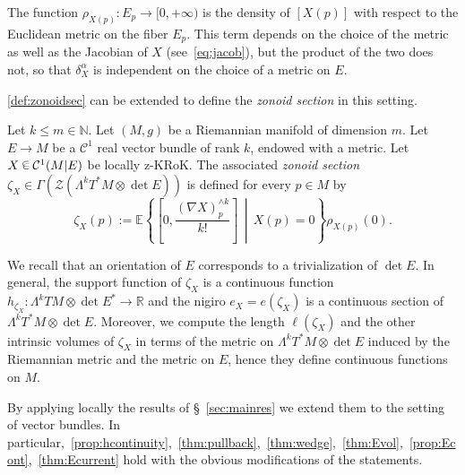 \documentclass[AHL, Unicode, longabstracts, published]{cedram}
\newcommand{\R}{\mathbb{R}}
\newcommand{\N}{\mathbb{N}}
\newcommand{\EE}{\mathbb{E}}
\newcommand{\ZZ}{\mathscr{Z}}
\newcommand{\mC}{\mathcal{C}}
\renewcommand{\a}{\alpha}
\newcommand*\randin{
\mathchoice {\raisebox{-.35ex}{$\displaystyle{^\subset}$}\mkern-11.5mu\raisebox{+.45ex}{$\displaystyle{_\subset}$}} {\mkern+1mu\raisebox{-.27ex}{$\textstyle{^\subset}$}\mkern-11.7mu\raisebox{+.45ex}{$\textstyle{_\subset}$}} {\raisebox{.35ex}{$\scriptstyle\subset$}\mkern-14mu\raisebox{-.15ex}{$\scriptstyle\subset$}} {\raisebox{.3ex}{$\scriptscriptstyle\subset$}\mkern-13.5mu\raisebox{-.10ex}{$\scriptscriptstyle\subset$}}}
\begin{document}
\begin{rema}
The function $\rho_{X(p)}\colon E_p\to [0,+\infty)$ is the density of $[X(p)]$ with respect to the Euclidean metric on the fiber $E_p$. This term depends on the choice of the metric as well as the Jacobian of $X$ (see~\eqref{eq:jacob}), but the product of the two does not, so that $\delta^\a_X$ is independent on the choice of a metric on $E$.
\end{rema}
\cref{def:zonoidsec} can be extended to define the \emph{zonoid section} in this setting.

\begin{defi}\label{def:zonoidsecvb}
Let $k\le m\in \N$. Let $(M,g)$ be a Riemannian manifold of dimension $m$. Let $E\to M$ be a $\mC^1$ real vector bundle of rank $k$, endowed with a metric. Let $X\,\randin\, \mC^1(M|E)$ be locally z-KRoK. The associated \emph{zonoid section} $\zeta_X\in \Gamma(\ZZ(\Lambda^k T^*M\otimes \det E))$ is defined for every $p\in M$ by
\begin{equation*}
\zeta_X(p):=\EE\left\{\left[0,\frac{(\nabla X)^{\wedge k}_p}{k!}\right]\,\middle|\,X(p)=0\right\}\rho_{X(p)}(0).
\end{equation*}
\end{defi}

We recall that an orientation of $E$ corresponds to a trivialization of $\det E$. In general, the support function of $\zeta_X$ is a continuous function $h_{\zeta_X}\colon \Lambda^k TM\otimes \det E^*\to \R$ and the nigiro $e_X=e(\zeta_X)$ is a continuous section of $\Lambda^k T^*M\otimes \det E$. Moreover, we compute the length $\ell(\zeta_X)$ and the other intrinsic volumes of $\zeta_X$ in terms of the metric on $\Lambda^kT^*M\otimes \det E$ induced by the Riemannian metric and the metric on $E$, hence they define continuous functions on $M$.

By applying locally the results of \S~\ref{sec:mainres} we extend them to the setting of vector bundles. In particular,~\cref{prop:hcontinuity},~\cref{thm:pullback},~\cref{thm:wedge},~\cref{thm:Evol},~\cref{prop:Econt},~\cref{thm:Ecurrent} hold with the obvious modifications of the statements.
\end{document}
